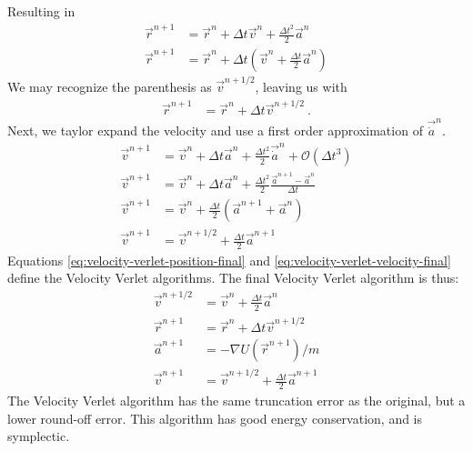 \documentclass[twoside,english]{uiofysmaster}
\newcommand\lr[1]{\left(#1\right)}
\begin{document}
Resulting in 
\begin{align}\label{eq:velocity-verlet}
	\vec{r}^{n+1} &= \vec{r}^n + \Delta t\vec{v}^n + \frac{\Delta t^2}{2}\vec{a}^n\\
	\vec{r}^{n+1} &= \vec{r}^n + \Delta t\lr{\vec{v}^n + \frac{\Delta t}{2}\vec{a}^n}	
\end{align}    
We may recognize the parenthesis as $\vec{v}^{n+1/2}$, leaving us with
\begin{align}
\vec{r}^{n+1} &= \vec{r}^n + \Delta t \vec{v}^{n+1/2}~. \label{eq:velocity-verlet-position-final}
\end{align}  
Next, we taylor expand the velocity and use a first order approximation of $\vec{\dot{a}}^n$.
\begin{align}
\vec{v}^{n+1} &= \vec{v}^n + \Delta t \vec{a}^{n} +  \frac{\Delta t^2}{2}\vec{\dot{a}}^n + \mathcal{O}(\Delta t^3)\\
\vec{v}^{n+1} &= \vec{v}^n + \Delta t \vec{a}^{n} +  \frac{\Delta t^2}{2}\frac{\vec{a}^{n+1} - \vec{a}^n}{\Delta t} \\
\vec{v}^{n+1} &= \vec{v}^n + \frac{\Delta t}{2} \lr{\vec{a}^{n+1} + \vec{a}^n} \\
\vec{v}^{n+1} &= \vec{v}^{n+1/2} + \frac{\Delta t}{2} \vec{a}^{n+1} \label{eq:velocity-verlet-velocity-final}
\end{align}
Equations \eqref{eq:velocity-verlet-position-final} and \eqref{eq:velocity-verlet-velocity-final} define the Velocity Verlet algorithms. 
The final Velocity Verlet algorithm is thus:
\savebox{}
\begin{align}
\vec{v}^{n+1/2}	 &= \vec{v}^{n} +  \frac{\Delta t}{2}\vec{a}^n\\
\vec{r}^{n+1} &= \vec{r}^n + \Delta t \vec{v}^{n+1/2}	\\
\vec{a}^{n+1} &= -\nabla U(\vec{r}^{n+1})/m\\
\vec{v}^{n+1} &= \vec{v}^{n+1/2} + \frac{\Delta t}{2} \vec{a}^{n+1}
\end{align}
The Velocity Verlet algorithm has the same truncation error as the original, but a lower round-off error. 
This algorithm has good energy conservation, and is symplectic.
\end{document}
